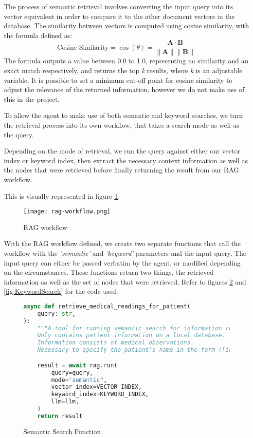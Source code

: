 The process of semantic retrieval involves converting the input query into its vector equivalent in order to compare it to the other document vectors in the database. The similarity between vectors is computed using cosine similarity, with the formula defined as:
\[
	\text{Cosine Similarity} = \cos(\theta) = \frac{\mathbf{A} \cdot \mathbf{B}}{\|\mathbf{A}\| \|\mathbf{B}\|}
\]
The formula outputs a value between 0.0 to 1.0, representing no similarity and an exact match respectively, and returns the top \textit{k} results, where \textit{k} is an adjustable variable.
It is possible to set a minimum cut-off point for cosine similarity to adjust the relevance of the returned information, however we do not make use of this in the project.

To allow the agent to make use of both semantic and keyword searches, we turn the retrieval process into its own workflow, that takes a search mode as well as the query.

Depending on the mode of retrieval, we run the query against either our vector index or keyword index, then extract the necessary context information as well as the nodes that were retrieved before finally returning the result from our RAG workflow.

This is visually represented in figure \ref{fig:RagWorkflow}.

\begin{figure}
	\centering
	\texttt{[image: rag-workflow.png]}
	\caption{RAG workflow}
	\label{fig:RagWorkflow}
\end{figure}

With the RAG workflow defined, we create two separate functions that call the workflow with the \textit{'semantic'} and \textit{'keyword'} parameters and the input query. The input query can either be passed verbatim by the agent, or modified depending on the circumstances. These functions return two things, the retrieved information as well as the set of nodes that were retrieved. Refer to figures \ref{fig:SemanticSearchFunc} and
\ref{fig:KeywordSearch} for the code used.
\begin{figure}
	\centering
	\small
	\begin{lstlisting}[language=Python, breaklines=true]
async def retrieve_medical_readings_for_patient(
    query: str,
):
    """A tool for running semantic search for information related to a patient.
    Only contains patient information on a local database.
    Information consists of medical observations.
    Necessary to specify the patient's name in the form ([information to search] for [patient name])."""

    result = await rag.run(
        query=query,
        mode="semantic",
        vector_index=VECTOR_INDEX,
        keyword_index=KEYWORD_INDEX,
        llm=llm,
    )
    return result
\end{lstlisting}
	\caption{Semantic Search Function}
	\label{fig:SemanticSearchFunc}
\end{figure}

